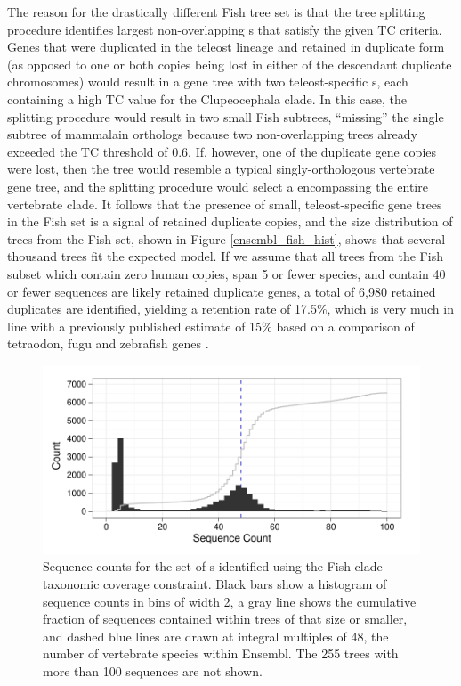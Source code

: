 The reason for the drastically different Fish tree set is that the
tree splitting procedure identifies largest non-overlapping \subtr{}s
that satisfy the given TC criteria. Genes that were duplicated in the
teleost lineage and retained in duplicate form (as opposed to one or
both copies being lost in either of the descendant duplicate
chromosomes) would result in a gene tree with two teleost-specific
\subtr{}s, each containing a high TC value for the Clupeocephala
clade. In this case, the splitting procedure would result in two small
Fish subtrees, ``missing'' the single subtree of mammalain orthologs
because two non-overlapping trees already exceeded the TC threshold of
0.6. If, however, one of the duplicate gene copies were lost, then the
tree would resemble a typical singly-orthologous vertebrate gene tree,
and the splitting procedure would select a \subtr encompassing the
entire vertebrate clade. It follows that the presence of small,
teleost-specific gene trees in the Fish set is a signal of retained
duplicate copies, and the size distribution of trees from the Fish
set, shown in Figure \ref{ensembl_fish_hist}, shows that several
thousand trees fit the expected model. If we assume that all trees
from the Fish subset which contain zero human copies, span 5 or fewer
species, and contain 40 or fewer sequences are likely retained
duplicate genes, a total of 6,980 retained duplicates are identified,
yielding a retention rate of 17.5\%, which is very much in line with a
previously published estimate of 15\% based on a comparison of
tetraodon, fugu and zebrafish genes \citep{TODO, Brunet et al. MBE
  2006}.

\begin{figure}[ht]
\centering
\includegraphics[scale=0.9]{Figs/ensembl_fish_hist.pdf}
\caption{Sequence counts for the set of \subtr{}s identified using the
  Fish clade taxonomic coverage constraint. Black bars show a
  histogram of sequence counts in bins of width 2, a gray line shows
  the cumulative fraction of sequences contained within trees of that
  size or smaller, and dashed blue lines are drawn at integral
  multiples of 48, the number of vertebrate species within
  Ensembl. The 255 trees with more than 100 sequences are not shown.}
\label{ensembl_roots_hist}
\end{figure}


